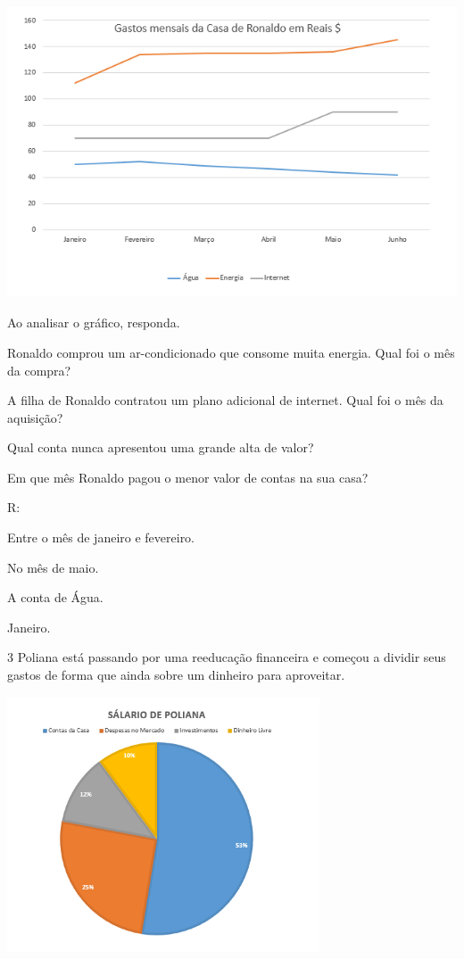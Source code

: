 {\includegraphics[width=5.30833in,height=3.41384in]{./imgSAEB_8_MAT/media/image40.png}

Ao analisar o gráfico, responda.
\item Ronaldo comprou um ar-condicionado que consome muita energia. Qual
foi o mês da compra?
\item A filha de Ronaldo contratou um plano adicional de internet. Qual foi
o mês da aquisição?
\item Qual conta nunca apresentou uma grande alta de valor?
\item Em que mês Ronaldo pagou o menor valor de contas na sua casa?

R:
\item Entre o mês de janeiro e fevereiro.
\item No mês de maio.
\item A conta de Água.
\item Janeiro.

\num{3} Poliana está passando por uma reeducação financeira e começou a
dividir seus gastos de forma que ainda sobre um dinheiro para
aproveitar.

\includegraphics[width=3.65in,height=2.98179in]{./imgSAEB_8_MAT/media/image41.png}

}
